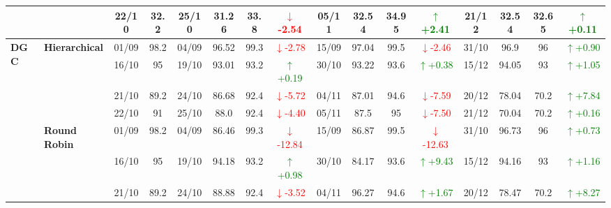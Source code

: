 {\begin{longtable}{llcc|cccc|cccc|cccc}
&
& 22/10 & 32.2 & 25/10 & 31.26 & 33.8 & \textcolor{red}{\(\downarrow\)-2.54} & 05/11 & 32.54 & 34.95 & \textcolor{green}{\(\uparrow\)+2.41} & 21/12 & 32.54 & 32.65 & \textcolor{green}{\(\uparrow\)+0.11} \\
\midrule




\multirow{12}{*}{\textbf{DGC}} 
& \textbf{Hierarchical}
& 01/09 & 98.2 & 04/09 & 96.52 & 99.3 & \textcolor{red}{\(\downarrow\)-2.78} & 15/09 & 97.04 & 99.5 & \textcolor{red}{\(\downarrow\)-2.46} & 31/10 & 96.9 & 96 & \textcolor{green}{\(\uparrow\)+0.90} \\

&
& 16/10 & 95 & 19/10 & 93.01 & 93.2 & \textcolor{green}{\(\uparrow\)+0.19} & 30/10 & 93.22 & 93.6 & \textcolor{green}{\(\uparrow\)+0.38} & 15/12 & 94.05 & 93 & \textcolor{green}{\(\uparrow\)+1.05} \\

&
& 21/10 & 89.2 & 24/10 & 86.68 & 92.4 & \textcolor{red}{\(\downarrow\)-5.72} & 04/11 & 87.01 & 94.6 & \textcolor{red}{\(\downarrow\)-7.59} & 20/12 & 78.04 & 70.2 & \textcolor{green}{\(\uparrow\)+7.84} \\

&
& 22/10 & 91 & 25/10 & 88.0 & 92.4 & \textcolor{red}{\(\downarrow\)-4.40} & 05/11 & 87.5 & 95 & \textcolor{red}{\(\downarrow\)-7.50} & 21/12 & 70.04 & 70.2 & \textcolor{green}{\(\uparrow\)+0.16} \\
\cmidrule(lr){2-16}


& \textbf{Round Robin}
& 01/09 & 98.2 & 04/09 & 86.46 & 99.3 & \textcolor{red}{\(\downarrow\)-12.84} & 15/09 & 86.87 & 99.5 & \textcolor{red}{\(\downarrow\)-12.63} & 31/10 & 96.73 & 96 & \textcolor{green}{\(\uparrow\)+0.73} \\

&
& 16/10 & 95 & 19/10 & 94.18 & 93.2 & \textcolor{green}{\(\uparrow\)+0.98} & 30/10 & 84.17 & 93.6 & \textcolor{green}{\(\uparrow\)+9.43} & 15/12 & 94.16 & 93 & \textcolor{green}{\(\uparrow\)+1.16} \\

&
& 21/10 & 89.2 & 24/10 & 88.88 & 92.4 & \textcolor{red}{\(\downarrow\)-3.52} & 04/11 & 96.27 & 94.6 & \textcolor{green}{\(\uparrow\)+1.67} & 20/12 & 78.47 & 70.2 & \textcolor{green}{\(\uparrow\)+8.27} \\


\end{longtable}}
